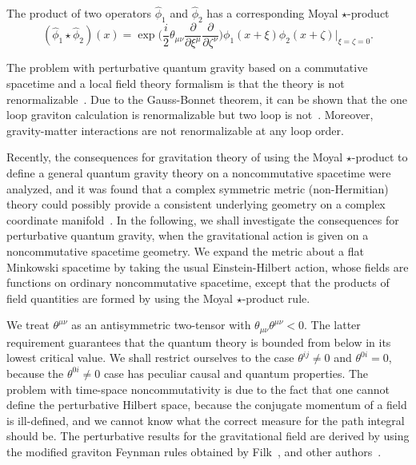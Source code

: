 \documentclass[a4paper,10pt]{article}
\begin{document}
The product of two operators ${\hat\phi}_1$ and ${\hat\phi}_2$
has a corresponding Moyal $\star$-product
\begin{equation}
({\hat\phi}_1\star{\hat\phi}_2)(x)
=\exp\biggr(\frac{i}{2}\theta_{\mu\nu}\frac{\partial}{\partial\xi^\mu}\frac{\partial}
{\partial\zeta^\nu}\biggr)\phi_1(x+\xi)\phi_2(x+\zeta)\vert_{\xi=\zeta=0}.
\end{equation}

The problem with perturbative quantum gravity
based on a commutative spacetime and a local field theory
formalism is that the theory is not
renormalizable~\cite{Veltman,Van}. Due to the Gauss-Bonnet
theorem, it can be shown that the one loop graviton calculation
is renormalizable but two loop is not~\cite{Sagnotti}.
Moreover, gravity-matter interactions are not renormalizable at
any loop order.

Recently, the consequences for gravitation theory of using the Moyal
$\star$-product to define a general quantum gravity theory on a
noncommutative spacetime were analyzed, and it was found that a complex
symmetric metric (non-Hermitian) theory could possibly provide a consistent
underlying geometry on a complex coordinate manifold~\cite{Moffat}.
In the following, we shall investigate the consequences for
perturbative quantum gravity, when the gravitational action is given on a
noncommutative spacetime geometry. We expand the metric about a
flat Minkowski spacetime by taking the usual Einstein-Hilbert action, whose
fields are functions on ordinary noncommutative spacetime, except that the
products of field quantities are formed by using the Moyal $\star$-product
rule.

We treat $\theta^{\mu\nu}$ as an antisymmetric two-tensor with
$\theta_{\mu\nu}\theta^{\mu\nu}< 0$. The latter requirement guarantees that
the quantum theory is bounded from below in its lowest critical value. We
shall restrict ourselves to the case $\theta^{ij}\not=0$ and
$\theta^{0i}=0$, because the $\theta^{0i}\not=0$ case has peculiar causal
and quantum properties. The problem with time-space noncommutativity is due
to the fact that one cannot define the perturbative Hilbert space,
because the conjugate momentum of a field is ill-defined, and we cannot
know what the correct measure for the path integral should be. The
perturbative results for the gravitational field are derived by using the
modified graviton Feynman rules obtained by Filk~\cite{Filk}, and other
authors~\cite{Varilly,Martin,Chaichian,Ishibashi,Chepelev,Minwalla,Hawkins,Jabbari,Micu}.
\end{document}

